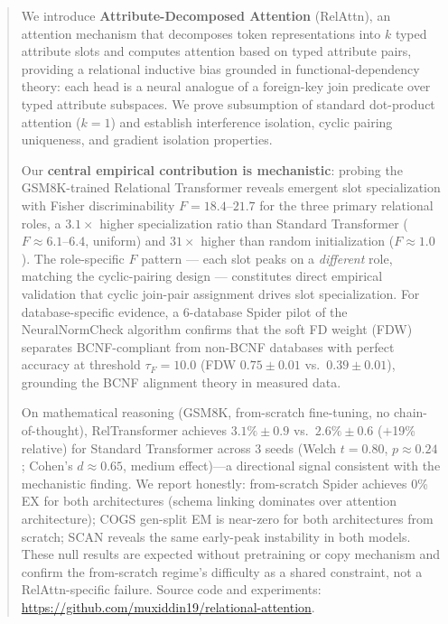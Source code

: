 \documentclass[conference]{IEEEtran}
\begin{document}
\begin{abstract}
We introduce \textbf{Attribute-Decomposed Attention} (RelAttn), an attention mechanism that decomposes token representations into $k$ typed attribute slots and computes attention based on typed attribute pairs, providing a relational inductive bias grounded in functional-dependency theory: each head is a neural analogue of a foreign-key join predicate over typed attribute subspaces. We prove subsumption of standard dot-product attention ($k{=}1$) and establish interference isolation, cyclic pairing uniqueness, and gradient isolation properties.

Our \textbf{central empirical contribution is mechanistic}: probing the GSM8K-trained Relational Transformer reveals emergent slot specialization with Fisher discriminability $F{=}18.4$--$21.7$ for the three primary relational roles, a $\mathbf{3.1\times}$ higher specialization ratio than Standard Transformer ($F{\approx}6.1$--$6.4$, uniform) and $31\times$ higher than random initialization ($F{\approx}1.0$). The role-specific $F$ pattern --- each slot peaks on a \emph{different} role, matching the cyclic-pairing design --- constitutes direct empirical validation that cyclic join-pair assignment drives slot specialization. For database-specific evidence, a 6-database Spider pilot of the NeuralNormCheck algorithm confirms that the soft FD weight (FDW) separates BCNF-compliant from non-BCNF databases with perfect accuracy at threshold $\tau_F{=}10.0$ (FDW $0.75{\pm}0.01$ vs.\ $0.39{\pm}0.01$), grounding the BCNF alignment theory in measured data.

On mathematical reasoning (GSM8K, from-scratch fine-tuning, no chain-of-thought), RelTransformer achieves $3.1\%{\pm}0.9$ vs.\ $2.6\%{\pm}0.6$ ($+$19\% relative) for Standard Transformer across 3 seeds (Welch $t{=}0.80$, $p{\approx}0.24$; Cohen's $d{\approx}0.65$, medium effect)---a directional signal consistent with the mechanistic finding. We report honestly: from-scratch Spider achieves 0\% EX for both architectures (schema linking dominates over attention architecture); COGS gen-split EM is near-zero for both architectures from scratch; SCAN reveals the same early-peak instability in both models. These null results are expected without pretraining or copy mechanism and confirm the from-scratch regime's difficulty as a shared constraint, not a RelAttn-specific failure. Source code and experiments: \url{https://github.com/muxiddin19/relational-attention}.
\end{abstract}
\end{document}
